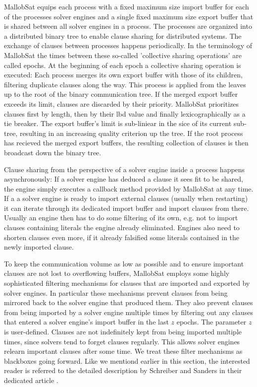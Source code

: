 \documentclass[12pt,a4paper,twoside]{scrartcl}
\numberwithin{equation}{section}
\begin{document}
MallobSat equips each process with a fixed maximum size import buffer for each of the processes solver engines and a single fixed maximum size export buffer that is shared between all solver engines in a process. The processes are organized into a distributed binary tree to enable clause sharing for distributed systems. The exchange of clauses between processes happens periodically. In the terminology of MallobSat the times between these so-called 'collective sharing operations' are called epochs. At the beginning of each epoch a collective sharing operation is executed: Each process merges its own export buffer with those of its children, filtering duplicate clauses along the way. This process is applied from the leaves up to the root of the binary communication tree. If the merged export buffer exceeds its limit, clauses are discarded by their priority. MallobSat prioritizes clauses first by length, then by their lbd value and finally lexicographically as a tie breaker. The export buffer's limit is sub-liniear in the sice of its current sub-tree, resulting in an increasing quality criterion up the tree. If the root process has recieved the merged export buffers, the resulting collection of clauses is then broadcast down the binary tree.

Clause sharing from the perspective of a solver engine inside a process happens asynchronously: If a solver engine has deduced a clause it sees fit to be shared, the engine simply executes a callback method provided by MallobSat at any time. If a a solver engine is ready to import external clauses (usually when restarting) it can iterate through its dedicated import buffer and import clauses from there. Usually an engine then has to do some filtering of its own, e.g. not to import clauses containing literals the engine already eliminated. Engines also need to shorten clauses even more, if it already falsified some literals contained in the newly imported clause.

To keep the communication volume as low as possible and to ensure important clauses are not lost to overflowing buffers, MallobSat employs some highly sophisticated filtering mechanisms for clauses that are imported and exported by solver engines. In particular these mechanisms prevent clauses from being mirrored back to the solver engine that produced them. They also prevent clauses from being imported by a solver engine multiple times by filtering out any clauses that entered a solver engine's import buffer in the last $z$ epochs. The parameter $z$ is user-defined. Clauses are not indefinitely kept from being imported multiple times, since solvers tend to forget clauses regularly. This allows solver engines relearn important clauses after some time. We treat these filter mechanisms as blackboxes going forward. Like we mentiond earlier in this section, the interested reader is referred to the detailed description by Schreiber and Sanders in their dedicated article \cite{mallobSat}.
\end{document}
